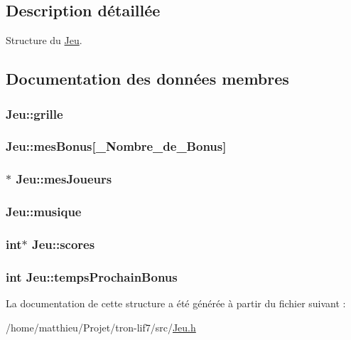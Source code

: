 \subsection{Description détaillée}
Structure du \hyperlink{structJeu}{Jeu}. 

\subsection{Documentation des données membres}
\hypertarget{structJeu_a004d8d0f888b9dea26cbbc2d6afea6e7}{
\subsubsection[{grille}]{ Jeu\-::grille}}\label{structJeu_a004d8d0f888b9dea26cbbc2d6afea6e7}
\hypertarget{structJeu_a70bf0e19753aaa6cfba719388aae410d}{
\subsubsection[{mes\-Bonus}]{ Jeu\-::mes\-Bonus\mbox{[}{\bf \-\_\-\-Nombre\-\_\-de\-\_\-\-Bonus}\mbox{]}}}\label{structJeu_a70bf0e19753aaa6cfba719388aae410d}
\hypertarget{structJeu_aafbe63ae87dd9d9b17e69ae94123ee31}{
\subsubsection[{mes\-Joueurs}]{$\ast$ Jeu\-::mes\-Joueurs}}\label{structJeu_aafbe63ae87dd9d9b17e69ae94123ee31}
\hypertarget{structJeu_a254bcdad7f9995cb345b777980ffdbe0}{
\subsubsection[{musique}]{ Jeu\-::musique}}\label{structJeu_a254bcdad7f9995cb345b777980ffdbe0}
\hypertarget{structJeu_a3db4303dcbb7630f11d5bfdf4a7bf181}{
\subsubsection[{scores}]{\setlength{\rightskip}{0pt plus 5cm}int$\ast$ Jeu\-::scores}}\label{structJeu_a3db4303dcbb7630f11d5bfdf4a7bf181}
\hypertarget{structJeu_a08a8620c89aa61ed6bbeb2dcf6c68a40}{
\subsubsection[{temps\-Prochain\-Bonus}]{\setlength{\rightskip}{0pt plus 5cm}int Jeu\-::temps\-Prochain\-Bonus}}\label{structJeu_a08a8620c89aa61ed6bbeb2dcf6c68a40}


La documentation de cette structure a été générée à partir du fichier suivant \-:\begin{DoxyCompactItemize}
\item 
/home/matthieu/\-Projet/tron-\/lif7/src/\hyperlink{Jeu_8h}{Jeu.\-h}\end{DoxyCompactItemize}

